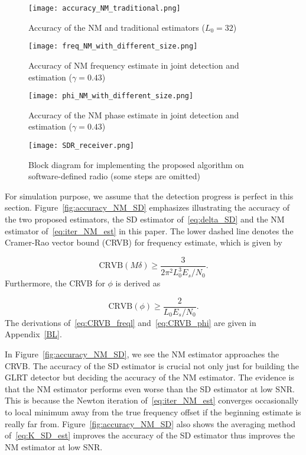 \begin{figure}[t]
    \centerline{\texttt{[image: accuracy\_NM\_traditional.png]}}
    \caption{Accuracy of the NM and traditional estimators ($L_0=32$)}
    \label{fig:accuracy_NM_traditional}
    \end{figure}

\begin{figure}[t]
    \centerline{\texttt{[image: freq\_NM\_with\_different\_size.png]}}
    \caption{Accuracy of NM frequency estimate in joint detection and estimation ($\gamma=0.43$)}
    \label{fig:accuracy_freq_NM_joint}
    \end{figure}

\begin{figure}[t]
    \centerline{\texttt{[image: phi\_NM\_with\_different\_size.png]}}
    \caption{Accuracy of the NM phase estimate in joint detection and estimation ($\gamma=0.43$)}
    \label{fig:accuracy_phi_NM_joint}
    \end{figure}

\begin{figure*}[t]
    \centerline{\texttt{[image: SDR\_receiver.png]}}
    \caption{Block diagram for implementing the proposed algorithm on software-defined radio (some steps are omitted)}
    \label{fig:SDR_receiver}
    \end{figure*}

For simulation purpose, we assume that the detection pro\-gress is perfect in this section.
Figure~\ref{fig:accuracy_NM_SD} emphasizes illustrating the accuracy of the two proposed estimators, 
the SD estimator of~\eqref{eq:delta_SD} and the NM estimator of~\eqref{eq:iter_NM_est} in this paper.
The lower dashed line denotes the Cramer-Rao vector bound (CRVB) for frequency estimate, which is given by

\begin{equation}
    \label{eq:CRVB_freql}
    \text{CRVB}(M\delta) \geq \frac{3}{2\pi^{2}L_{0}^3E_s/N_{0}}.
  \end{equation}
Furthermore, the CRVB for $\phi$ is derived as

\begin{equation}
    \label{eq:CRVB_phi}
    \text{CRVB}(\phi) \geq \frac{2}{L_{0}E_s/N_{0}}.
  \end{equation}
The derivations of~\eqref{eq:CRVB_freql} and~\eqref{eq:CRVB_phi} are given in Appendix~\ref{BL}.

In Figure~\ref{fig:accuracy_NM_SD}, we see the NM estimator approaches the CRVB. The accuracy of the SD estimator is crucial
not only just for building the GLRT detector but deciding the accuracy of the NM estimator.
The evidence is that the NM estimator performs even worse than the SD estimator at low SNR.
This is because the Newton iteration of~\eqref{eq:iter_NM_est} converges occasionally to local
minimum away from the true frequency offset if the beginning estimate is really far from. Figure~\ref{fig:accuracy_NM_SD} also shows the averaging method of~\eqref{eq:K_SD_est}
improves the accuracy of the SD estimator thus improves the NM estimator at low SNR.

